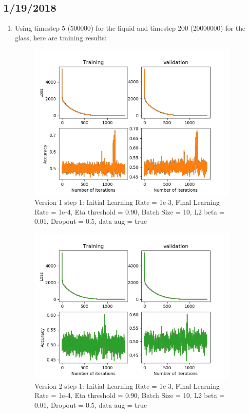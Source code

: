 \documentclass[12pt,reqno]{amsart}
\numberwithin{equation}{section}
\begin{document}
\subsection{1/19/2018}
\begin{enumerate}
\item Using timestep 5 (500000) for the liquid and timestep 200 (20000000) for the glass, here are training results:

\begin{figure}[H]
\centering
\includegraphics[scale=0.6]{data_liquid5_version1_step1}
\caption{Version 1 step 1: Initial Learning Rate = 1e-3, Final Learning Rate = 1e-4, Eta threshold = 0.90, Batch Size = 10, L2 beta = 0.01, Dropout = 0.5, data aug = true}
\end{figure}

\begin{figure}[H]
\centering
\includegraphics[scale=0.6]{data_liquid5_version2_step1}
\caption{Version 2 step 1: Initial Learning Rate = 1e-3, Final Learning Rate = 1e-4, Eta threshold = 0.90, Batch Size = 10, L2 beta = 0.01, Dropout = 0.5, data aug = true}
\end{figure}


\end{enumerate}
\end{document}

